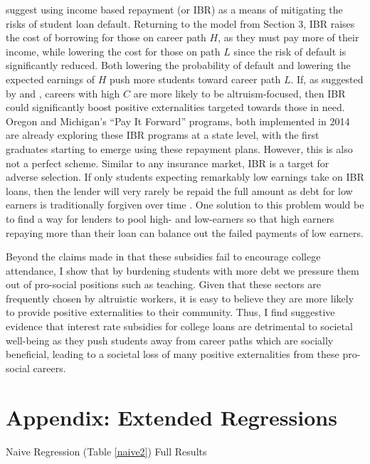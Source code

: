 \documentclass[12pt]{article}
\newcommand{\regs}{../Analysis/Regressions/Output/}
\begin{document}
	\textcite{abraham2018} suggest using income based repayment (or IBR) as a means of mitigating the risks of student loan default. Returning to the model from Section 3, IBR raises the cost of borrowing for those on career path $H$, as they must pay more of their income, while lowering the cost for those on path $L$ since the risk of default is significantly reduced. Both lowering the probability of default and lowering the expected earnings of $H$ push more students toward career path $L$. If, as suggested by \textcite{benshem1991} and \textcite{hanson1995}, careers with high $C$ are more likely to be altruism-focused, then IBR could significantly boost positive externalities targeted towards those in need.  Oregon and Michigan's ``Pay It Forward'' programs, both implemented in 2014 are already exploring these IBR programs at a state level, with the first graduates starting to emerge using these repayment plans. However, this is also not a perfect scheme. Similar to any insurance market, IBR is a target for adverse selection. If only students expecting remarkably low earnings take on IBR loans, then the lender will very rarely be repaid the full amount as debt for low earners is traditionally forgiven over time \parencite{dynarski2015}. One solution to this problem would be to find a way for lenders to pool high- and low-earners so that high earners repaying more than their loan can balance out the failed payments of low earners.
	
	Beyond the claims made in  \textcite{dynarski2015} that these subsidies fail to encourage college attendance, I show that by burdening students with more debt we pressure them out of pro-social positions such as teaching. Given that these sectors are frequently chosen by altruistic workers, it is easy to believe they are more likely to provide positive externalities to their community. Thus, I find suggestive evidence that interest rate subsidies for college loans are detrimental to societal well-being as they push students away from career paths which are socially beneficial, leading to a societal loss of many positive externalities from these pro-social careers.
	
	
	
	
	\clearpage
	\appendix
	\section*{Appendix: Extended Regressions}
	
	\begin{table}
		\centering
		\caption{Naive Regression (Table \ref{naive2}) Full Results}
		\resizebox{\textwidth}{!}{
			
		}
		\label{naivefull}
	\end{table}
\end{document}
